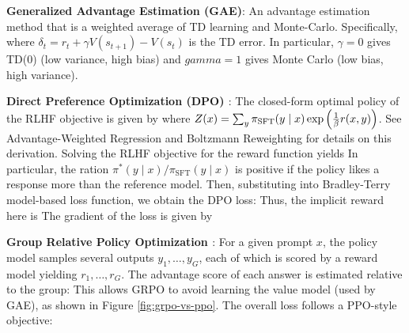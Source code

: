 \documentclass{article}
\begin{document}
  \textbf{Generalized Advantage Estimation (GAE)}: An advantage estimation method that is a weighted average of TD learning and Monte-Carlo. Specifically,
  where $\delta_t=r_t+\gamma V(s_{t+1})-V(s_t)$ is the TD error. In particular, $\gamma=0$ gives TD(0) (low variance, high bias) and $gamma=1$ gives Monte Carlo (low bias, high variance).

  \textbf{Direct Preference Optimization (DPO) \cite{rafailov2023direct}}: The closed-form optimal policy of the RLHF objective is given by 
  where $Z(x)=\sum_y \pi_\text{SFT}(y\mid x)\exp\left( \frac{1}{\beta}r(x,y) \right)$. See Advantage-Weighted Regression and Boltzmann Reweighting for details on this derivation. Solving the RLHF objective for the reward function yields 
  In particular, the ration $\pi^*(y\mid x)/\pi_\text{SFT}(y\mid x)$ is positive if the policy likes a response more than the reference model. Then, substituting into Bradley-Terry model-based loss function, we obtain the DPO loss:
  Thus, the implicit reward here is
  The gradient of the loss is given by

  \textbf{Group Relative Policy Optimization \cite{guo2025deepseek,shao2024deepseekmath}}: For a given prompt $x$, the policy model samples several outputs $y_1,\dots,y_G$, each of which is scored by a reward model yielding $r_1,\dots,r_G$. The advantage score of each answer is estimated relative to the group:
  This allows GRPO to avoid learning the value model (used by GAE), as shown in Figure \ref{fig:grpo-vs-ppo}. The overall loss follows a PPO-style objective:
\end{document}

